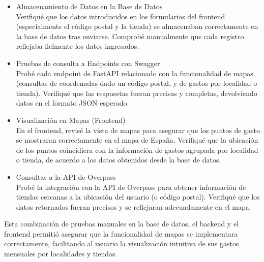 \begin{itemize}
    \item Almacenamiento de Datos en la Base de Datos\\
     Verifiqué que los datos introducidos en los formularios del frontend (especialmente el código postal y la tienda) se almacenaban correctamente en la base de datos tras enviarse. Comprobé manualmente que cada registro reflejaba fielmente los datos ingresados.
    \item Pruebas de consulta a Endpoints con Swagger\\
     Probé cada endpoint de FastAPI relacionado con la funcionalidad de mapas (consultas de coordenadas dado un código postal, y de gastos por localidad o tienda). Verifiqué que las respuestas fueran precisas y completas, devolviendo datos en el formato JSON esperado.
    \item Visualización en Mapas (Frontend)\\
     En el frontend, revisé la vista de mapas para asegurar que los puntos de gasto se mostraran correctamente en el mapa de España. Verifiqué que la ubicación de los puntos coincidiera con la información de gastos agrupada por localidad o tienda, de acuerdo a los datos obtenidos desde la base de datos.
    \item Consultas a la API de Overpass\\
     Probé la integración con la API de Overpass para obtener información de tiendas cercanas a la ubicación del usuario (o código postal). Verifiqué que los datos retornados fueran precisos y se reflejaran adecuadamente en el mapa.
\end{itemize}

Esta combinación de pruebas manuales en la base de datos, el backend y el frontend permitió asegurar que la funcionalidad de mapas se implementara correctamente, facilitando al usuario la visualización intuitiva de sus gastos mensuales por localidades y tiendas.


